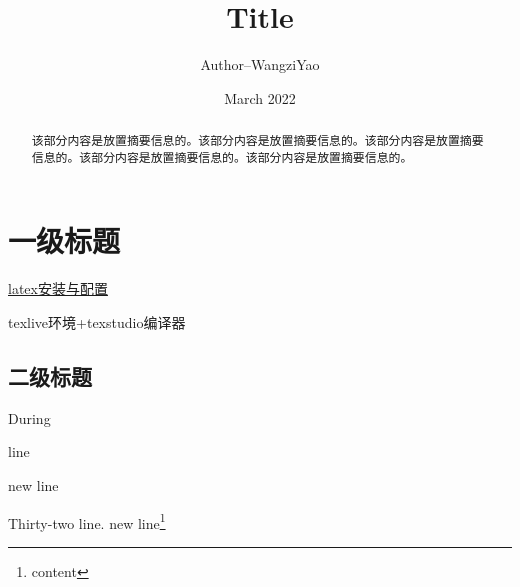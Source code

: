 \documentclass[12pt]{ctexart} %
\begin{document}
\pagestyle{plain}%
\title{Title} %
\author{Author--WangziYao} %
\date{March 2022}
\maketitle %

\thispagestyle{empty} %
\newpage %


\begin{spacing}{1}%
\tableofcontents %
\end{spacing}

\newpage %
\listoffigures %
\newpage %
\listoftables %
\newpage %


\begin{abstract}
该部分内容是放置摘要信息的。该部分内容是放置摘要信息的。该部分内容是放置摘要信息的。该部分内容是放置摘要信息的。该部分内容是放置摘要信息的。
\end{abstract}
\newpage

\section{一级标题} %
\href{http://t.csdn.cn/iGyt7}{latex安装与配置}

texlive环境+texstudio编译器
\subsection{二级标题} %

During

\indent line%
\par new line%

\noindent Thirty-two line.%
new line\footnote{content}
\end{document}
